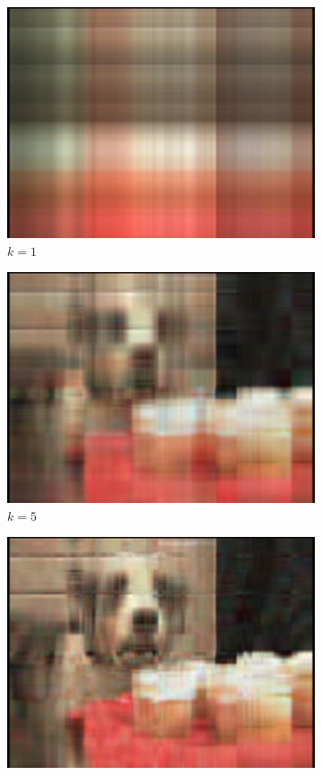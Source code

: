 \documentclass[11pt,a4paper]{article}
\begin{document}
\begin{figure}[H]
  \centering
  \begin{subfigure}[t]{.5\textwidth}
    \centering
    \includegraphics[scale=0.3]{img/k1_me_in_nla}
    \caption{$k = 1$}
  \end{subfigure}%
  \begin{subfigure}[t]{.5\textwidth}
    \centering
    \includegraphics[scale=0.3]{img/k5_me_in_nla}
    \caption{$k = 5$}
  \end{subfigure}
  \begin{subfigure}[t]{.5\textwidth}
    \centering
    \includegraphics[scale=0.3]{img/k10_me_in_nla}

\end{subfigure}
\end{figure}
\end{document}

